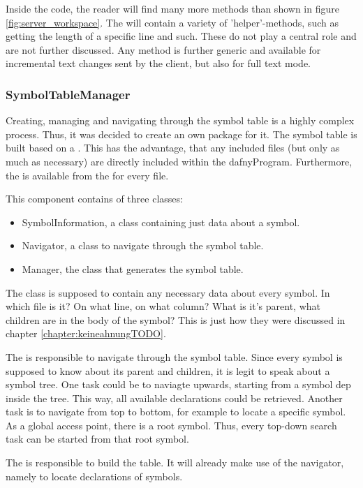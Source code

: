 Inside the code, the reader will find many more methods than shown in figure \ref{fig:server_workspace}. The  will contain a variety of 'helper'-methods, such as getting the length of a specific line and such. These do not play a central role and are not further discussed. Any  method is further generic and available for incremental text changes sent by the client, but also for full text mode.

\subsubsection{SymbolTableManager}
Creating, managing and navigating through the symbol table is a highly complex process. Thus, it was decided to create an own package for it. The symbol table is built based on a . This has the advantage, that any included files (but only as much as necessary) are directly included within the dafnyProgram. Furthermore, the  is available from the  for every file.

This component contains of three classes:
\begin{itemize}
    \item SymbolInformation, a class containing just data about a symbol.
    \item Navigator, a class to navigate through the symbol table.
    \item Manager, the class that generates the symbol table.
\end{itemize}

The  class is supposed to contain any necessary data about every symbol. In which file is it? On what line, on what column? What is it's parent, what children are in the body of the symbol? This is just how they were discussed in chapter \ref{chapter:keineahnungTODO}.

The  is responsible to navigate through the symbol table. Since every symbol is supposed to know about its parent and children, it is legit to speak about a symbol tree. One task could be to naviagte upwards, starting from a symbol dep inside the tree. This way, all available declarations could be retrieved. Another task is to navigate from top to bottom, for example to locate a specific symbol. As a global access point, there is a root symbol. Thus, every top-down search task can be started from that root symbol.

The  is responsible to build the table. It will already make use of the navigator, namely to locate declarations of symbols.

